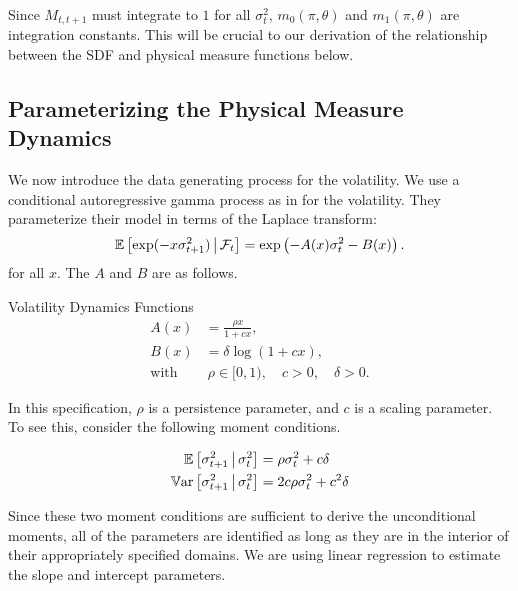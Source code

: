 \documentclass[11pt, letterpaper, twoside]{article}
\begin{document}
Since $M_{t,t+1}$ must integrate to $1$ for all $\sigma^2_t$, $m_{0}(\pi, \theta)$ and $m_1(\pi, \theta)$ are integration constants. This will be crucial to our derivation of the relationship between the SDF and physical measure functions below.

\subsection{Parameterizing the Physical Measure Dynamics}

We now introduce the data generating process for the volatility. We use a conditional autoregressive gamma process as in \textcite{gourieroux2006autoregressive, han2018leverage} for the volatility. 
They parameterize their model in terms of the Laplace transform: 
%
\begin{equation}
    \operatorname{\mathbb{E}}\left[\exp(-x \sigma^2_{t+1}) \,\middle\vert\, \mathcal{F}_{t}\right] = \exp\left(- A(x) \sigma^2_{t} - B(x)\right). 
\end{equation}
%
for all $x$.
The $A$ and $B$ are as follows.

\begin{defn}{Volatility Dynamics Functions}
     \label{defn:physical_vol_dynamics}
     \begin{align}
        \label{defn:a_PP}
        A(x) &= \frac{\rho x}{1 + c x}, \\
        \label{defn:b_PP}
        B(x) &= \delta \log(1 + c x), \\
        \text{with}&\ \rho \in [0,1), \quad c > 0, \quad \delta > 0. \nonumber
     \end{align}

\end{defn}

In this specification, $\rho$ is a persistence parameter, and $c$ is a scaling parameter. To see this, consider the following moment conditions. 

\begin{remark} 
 \label{remark:vol_moment_conditions}
    \begin{align}
        \E\left[\sigma^2_{t+1} \mvert \sigma^2_t \right] &= \rho \sigma^2_t + c \delta\\
%   
        \Var\left[\sigma^2_{t+1} \mvert \sigma^2_t \right] &= 2 c \rho \sigma^2_t + c^2 \delta 
%   
    \end{align}
\end{remark}

Since these two moment conditions are sufficient to derive the unconditional moments, all of the parameters are identified as long as they are in the interior of their appropriately specified domains. We are using linear regression to estimate the slope and intercept parameters.
\end{document}
